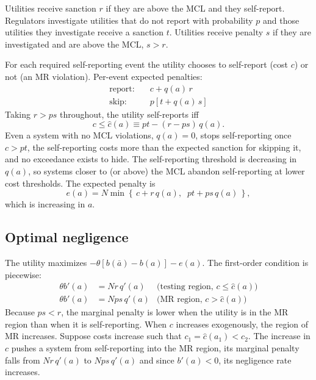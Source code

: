 \documentclass[12pt]{article}
\begin{document}
Utilities receive sanction $r$ if they are above the MCL and they self-report. Regulators investigate utilities that do not report with probability $p$ and those utilities they investigate receive a sanction $t$. Utilities receive penalty $s$ if they are investigated and are above the MCL, $s>r$.


For each required self-reporting event the utility chooses to self-report (cost $c$) or not (an MR violation). Per-event expected penalties:
\begin{align*}
\text{report:} \quad & c + q(a)\,r \\
\text{skip:} \quad & p\left[t + q(a)\,s\right]
\end{align*}
Taking $r > ps$ throughout, the utility self-reports iff
\begin{equation}\label{eq:chat}
c \le \hat{c}(a) \equiv pt - (r - ps)\,q(a).
\end{equation}
Even a system with no MCL violations, $q(a) = 0$, stops self-reporting once $c > pt$, the self-reporting costs more than the expected sanction for skipping it, and no exceedance exists to hide. The self-reporting threshold is decreasing in $q(a)$, so systems closer to (or above) the MCL abandon self-reporting at lower cost thresholds. The expected penalty is
\begin{equation}\label{eq:endog_penalty}
e(a) = N \min\left\{\, c + r\,q(a),\;\; pt + ps\,q(a) \,\right\},
\end{equation}
which is increasing in $a$.

\subsection{Optimal negligence}

The utility maximizes $-\theta[b(\bar{a}) - b(a)] - e(a)$. The first-order condition is piecewise:
\begin{align}
\theta b'(a) &= N r\, q'(a) & \text{(testing region, } c \le \hat{c}(a)) \\
\theta b'(a) &= N ps\, q'(a) & \text{(MR region, } c > \hat{c}(a))
\end{align}
Because $ps < r$, the marginal penalty is lower when the utility is in the MR region than when it is self-reporting. When $c$ increases exogenously, the region of MR increases. Suppose costs increase such that $c_1 =\hat{c}(a_1) < c_2$. The increase in $c$ pushes a system from self-reporting into the MR region, its marginal penalty falls from $Nr\,q'(a)$ to $Nps\,q'(a)$ and since $b'(a)<0$, its negligence rate increases.
\end{document}
